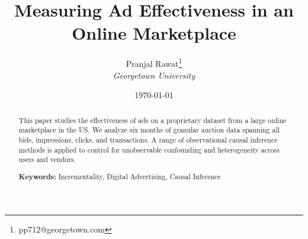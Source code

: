 \documentclass[12pt,a4paper]{article}
\title{Measuring Ad Effectiveness in an Online Marketplace}
\author{
    Pranjal Rawat\footnote{pp712@georgetown.com}\\
    \textit{Georgetown University}
}
\date{\today}
\begin{document}
\maketitle

\begin{abstract}
\noindent This paper studies the effectiveness of ads on a proprietary dataset from a large online marketplace in the US. 
We analyze six months of granular auction data spanning all bids, impressions, clicks, and transactions. 
A range of observational causal inference methods is applied to control for unobservable confounding and heterogeneity across users and vendors. 

\vspace{0.5cm}
\noindent \textbf{Keywords:} Incrementality, Digital Advertising, Causal Inference
\end{abstract}








%
%
%

\end{document}
